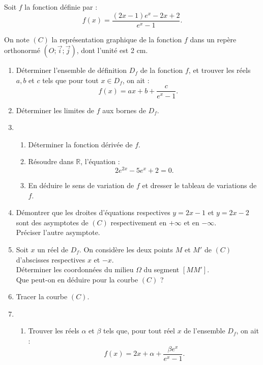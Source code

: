 \documentclass[12pt,a4paper]{article}
\begin{document}
\begin{multicols}{2}
Soit \( f \) la fonction définie par :
\[
f(x) = \frac{(2x - 1)e^x - 2x + 2}{e^x - 1}.
\]

On note \( (C) \) la représentation graphique de la fonction \( f \) dans un repère orthonormé \( (O ; \vec{i} ; \vec{j}) \), dont l’unité est 2 cm.

\begin{enumerate}
    \item Déterminer l’ensemble de définition \( D_f \) de la fonction \( f \), et trouver les réels \( a, b \) et \( c \) tels que pour tout \( x \in D_f \), on ait :
    \[
    f(x) = ax + b + \frac{c}{e^x - 1}.
    \]

    \item Déterminer les limites de \( f \) aux bornes de \( D_f \).

    \item 
    \begin{enumerate}
        \item Déterminer la fonction dérivée de \( f \).
        \item Résoudre dans \( \mathbb{R} \), l’équation :
        \[
        2e^{2x} - 5e^x + 2 = 0.
        \]
        \item En déduire le sens de variation de \( f \) et dresser le tableau de variations de \( f \).
    \end{enumerate}

    \item Démontrer que les droites d’équations respectives \( y = 2x - 1 \) et \( y = 2x - 2 \) sont des asymptotes de \( (C) \) respectivement en \( +\infty \) et en \( -\infty \).\\
    Préciser l’autre asymptote.

    \item Soit \( x \) un réel de \( D_f \). On considère les deux points \( M \) et \( M' \) de \( (C) \) d’abscisses respectives \( x \) et \( -x \).\\
    Déterminer les coordonnées du milieu \( \Omega \) du segment \( [MM'] \).\\
    Que peut-on en déduire pour la courbe \( (C) \) ?
    \item Tracer la courbe \( (C) \).
    \item
    \begin{enumerate}
        \item Trouver les réels \( \alpha \) et \( \beta \) tels que, pour tout réel \( x \) de l’ensemble \( D_f \), on ait :
        \[
        f(x) = 2x + \alpha + \frac{\beta e^x}{e^x - 1}.
        \]


\end{enumerate}
\end{enumerate}
\end{multicols}
\end{document}
